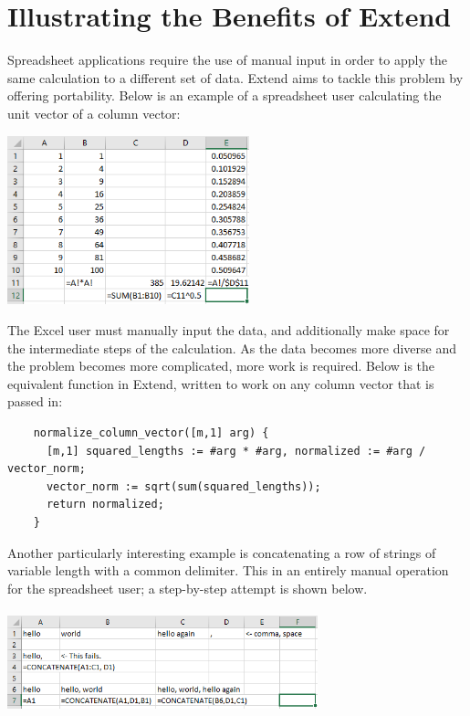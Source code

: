 \section{Illustrating the Benefits of Extend}
Spreadsheet applications require the use of manual input in order to apply the same calculation to a different set of data. Extend aims to tackle this problem by offering portability. Below is an example of a spreadsheet user calculating the unit vector of a column vector:

\begin{center}
\includegraphics[width=7cm]{img/unitvector.png}
\end{center}

\medskip \noindent The Excel user must manually input the data, and additionally make space for the intermediate steps of the calculation. As the data becomes more diverse and the problem becomes more complicated, more work is required. Below is the equivalent function in Extend, written to work on any column vector that is passed in:

\begin{lstlisting}
	normalize_column_vector([m,1] arg) {
	  [m,1] squared_lengths := #arg * #arg, normalized := #arg / vector_norm;
	  vector_norm := sqrt(sum(squared_lengths));
	  return normalized;
	}
\end{lstlisting}

\medskip \noindent Another particularly interesting example is concatenating a row of strings of variable length with a common delimiter. This in an entirely manual operation for the spreadsheet user; a step-by-step attempt is shown below.

\begin{center}
\includegraphics[width=9cm,height=3cm]{img/concatenation.png}
\end{center}

